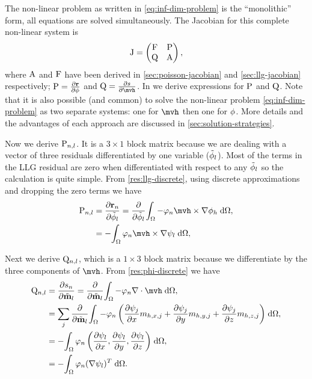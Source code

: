 {The non-linear problem as written in \cref{eq:inf-dim-problem} is the ``monolithic'' form, \ie all equations are solved simultaneously.
The Jacobian for this complete non-linear system is
\begin{equation}
  \mathrm{J} =
  \begin{pmatrix}
    \mathrm{F}   & \mathrm{P} \\
    \mathrm{Q}   & \mathrm{A} \\
  \end{pmatrix},
  \label{eq:monolithic-jac}
\end{equation}
where $\mathrm{A}$ and $\mathrm{F}$ have been derived in \cref{sec:poisson-jacobian} and \cref{sec:llg-jacobian} respectively; $\mathrm{P} = \frac{\partial \boldsymbol{\mathrm{r}}}{\partial \phi}$ and $\Qm = \pd{\rphi}{\mvh}$.
In  we derive expressions for $\mathrm{P}$ and $\mathrm{Q}$.
Note that it is also possible (and common) to solve the non-linear problem \cref{eq:inf-dim-problem} as two separate systems: one for $\mvh$ then one for $\phi$.
More details and the advantages of each approach are discussed in \cref{sec:solution-strategies}.

Now we derive $\mathrm{P}_{n,l}$.
It is a $3 \times 1$ block matrix because we are dealing with a vector of three residuals differentiated by one variable ($\tilde{\phi}_l$).
Most of the terms in the LLG residual are zero when differentiated with respect to any $\tilde{\phi}_l$ so the calculation is quite simple.
From \cref{res:llg-discrete}, using discrete approximations and dropping the zero terms we have
\begin{equation}
  \begin{aligned}
    \Pm_{n,l} &= \pd{\rllgv_n}{\phimdis_l}
    = \pd{}{\phimdis_l} \intd{ -\tbf_n \mvh \times \grad \phimh}, \\
    &= -\intd{ \tbf_n \mvh \times \grad \sbf_l}, \\
  \end{aligned}
\end{equation}

Next we derive $\mathrm{Q}_{n,l}$, which is a $1 \times 3$ block matrix because we differentiate by the three components of $\mvh$.
From \cref{res:phi-discrete} we have
\begin{equation}
  \begin{aligned}
    \Qm_{n,l} &= \pd{\rphi_n}{\mvdis_l} = \pd{}{\mvdis_l} \intd{ -\tbf_n \div \mvh}, \\
    &= \sum_j \pd{}{\mvdis_l} \intd{ -\tbf_n \left( \pd{\sbf_j}{x} m_{h,x,j}
        + \pd{\sbf_j}{y} m_{h,y,j} + \pd{\sbf_j}{z} m_{h,z,j} \right) }, \\
    &= -\intd{ \tbf_n \left( \pd{\sbf_l}{x},
        \pd{\sbf_l}{y}, \pd{\sbf_l}{z} \right) }, \\
    &= -\intd{\tbf_n (\grad \sbf_l)^T}.
  \end{aligned}
\end{equation}


}
